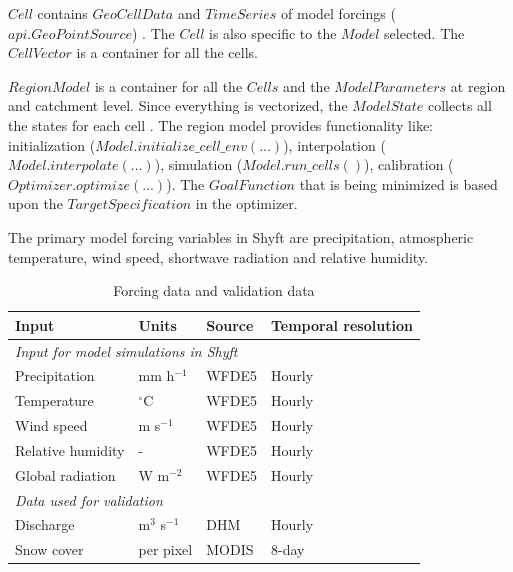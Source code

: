 $Cell$ contains $GeoCellData$ and $TimeSeries$ of model forcings ($api.GeoPointSource$) \autocite{burkhartShyftV4Framework2021}. The $Cell$ is also specific to the $Model$ selected. The $CellVector$ is a container for all the cells. 

$RegionModel$ is a container for all the $Cells$ and the $Model Parameters$ at region and catchment level. Since everything is vectorized, the $Model State$ collects all the states for each cell \autocite{burkhartShyftV4Framework2021}. The region model provides functionality like: initialization ($Model.initialize\_cell\_env(...)$), interpolation ($Model.interpolate(...)$), simulation ($Model.run\_cells()$), calibration ($Optimizer.optimize(...)$). The $GoalFunction$ that is being minimized is based upon the $TargetSpecification$ in the optimizer.

The primary model forcing variables in Shyft are precipitation, atmospheric temperature, wind speed, shortwave radiation and relative humidity.


\begin{table}[ht]
\centering
\caption{Forcing data and validation data}
\label{tab:forcing_validation}
\begin{tabular}{llll}
\toprule
\textbf{Input}    & \textbf{Units}   & \textbf{Source} & \textbf{Temporal resolution} \\
\hline
\multicolumn{4}{l}{\textit{Input for model simulations in Shyft}}                     \\
\hline
Precipitation     & mm h$^{-1}$      & WFDE5           & Hourly                       \\
Temperature       & $^{\circ}$C      & WFDE5           & Hourly                       \\
Wind speed        & m s$^{-1}$       & WFDE5           & Hourly                       \\
Relative humidity & -                & WFDE5           & Hourly                       \\
Global radiation  & W m$^{-2}$       & WFDE5           & Hourly                       \\
\hline
\multicolumn{4}{l}{\textit{Data used for validation}}                                 \\
\hline
Discharge         & m$^{3}$ s$^{-1}$ & DHM             & Hourly                       \\
Snow cover        & per pixel        & MODIS           & 8-day    \\
\bottomrule
\end{tabular}%
\end{table}


